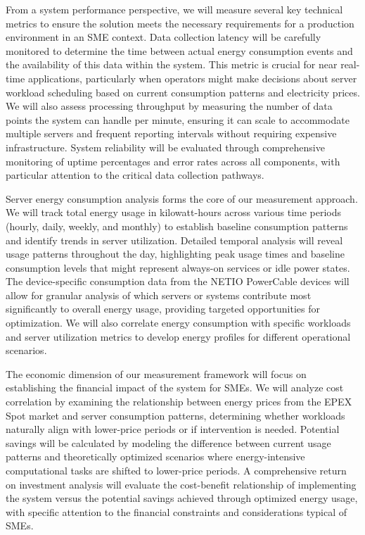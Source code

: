 From a system performance perspective, we will measure several key technical metrics to ensure the
solution meets the necessary requirements for a production environment in an SME context. Data
collection latency will be carefully monitored to determine the time between actual energy
consumption events and the availability of this data within the system. This metric is crucial for
near real-time applications, particularly when operators might make decisions about server workload
scheduling based on current consumption patterns and electricity prices. We will also assess
processing throughput by measuring the number of data points the system can handle per minute,
ensuring it can scale to accommodate multiple servers and frequent reporting intervals without
requiring expensive infrastructure. System reliability will be evaluated through comprehensive
monitoring of uptime percentages and error rates across all components, with particular attention
to the critical data collection pathways.

Server energy consumption analysis forms the core of our measurement approach. We will track total
energy usage in kilowatt-hours across various time periods (hourly, daily, weekly, and monthly)
to establish baseline consumption patterns and identify trends in server utilization. Detailed
temporal analysis will reveal usage patterns throughout the day, highlighting peak usage times
and baseline consumption levels that might represent always-on services or idle power states.
The device-specific consumption data from the NETIO PowerCable devices will allow for granular
analysis of which servers or systems contribute most significantly to overall energy usage,
providing targeted opportunities for optimization. We will also correlate energy consumption with
specific workloads and server utilization metrics to develop energy profiles for different
operational scenarios.

The economic dimension of our measurement framework will focus on establishing the financial impact
of the system for SMEs. We will analyze cost correlation by examining the relationship between
energy prices from the EPEX Spot market and server consumption patterns, determining whether
workloads naturally align with lower-price periods or if intervention is needed. Potential savings
will be calculated by modeling the difference between current usage patterns and theoretically
optimized scenarios where energy-intensive computational tasks are shifted to lower-price periods.
A comprehensive return on investment analysis will evaluate the cost-benefit relationship of
implementing the system versus the potential savings achieved through optimized energy usage, with
specific attention to the financial constraints and considerations typical of SMEs.

